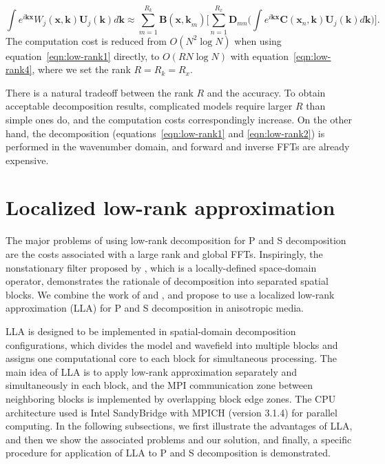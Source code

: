 \documentclass[manuscript,ulem,graphix,revised]{geophysics}
\begin{document}
\begin{equation}
\int e^{i\mathbf{kx}}W_j(\mathbf{x,k})\mathbf{U}_j(\mathbf{k})d\mathbf{k}\approx\sum^{R_k}_{m=1}\mathbf{B}(\mathbf{x,k}_{m}) \bigg[\sum^{R_x}_{n=1} \mathbf{D}_{m n} \Big(\int e^{i\mathbf{kx}} \mathbf{C}(\mathbf{x}_{n},\mathbf{k}) \mathbf{U}_j(\mathbf{k})d \mathbf{k}\Big)\bigg]. 
\label{eqn:low-rank4}
\end{equation}
The computation cost is reduced from $O(N^2\log{N})$ when using equation~\ref{eqn:low-rank1} directly, to $O(RN\log{N})$ with equation~\ref{eqn:low-rank4}, where we set the rank $R=R_k=R_x$.

There is a natural tradeoff between the rank $R$ and the accuracy. To obtain acceptable decomposition results, complicated models require larger $R$ than simple ones do, and the computation costs correspondingly increase. On the other hand, the decomposition (equations~\ref{eqn:low-rank1} and \ref{eqn:low-rank2}) is performed in the wavenumber domain, and forward and inverse FFTs are already expensive. 

\section {Localized low-rank approximation}
\indent\indent
The major problems of using low-rank decomposition for P and S decomposition are the costs associated with a large rank and global FFTs. Inspiringly, the nonstationary filter proposed by \citet{yan09}, which is a locally-defined space-domain operator, demonstrates the rationale of decomposition into separated spatial blocks. We combine the work of \citet{yan09} and \citet{cheng14}, and propose to use a localized low-rank approximation (LLA) for P and S decomposition in anisotropic media.

LLA is designed to be implemented in spatial-domain decomposition configurations, which divides the model and wavefield into multiple blocks and assigns one computational core to each block for simultaneous processing. The main idea of LLA is to apply low-rank approximation separately and simultaneously in each block, and the MPI communication zone between neighboring blocks is implemented by overlapping block edge zones. The CPU architecture used is Intel SandyBridge with MPICH (version 3.1.4) for parallel computing.
In the following subsections, we first illustrate the advantages of LLA, and then we show the associated problems and our solution, and finally, a specific procedure for application of LLA to P and S decomposition is demonstrated.
\end{document}
